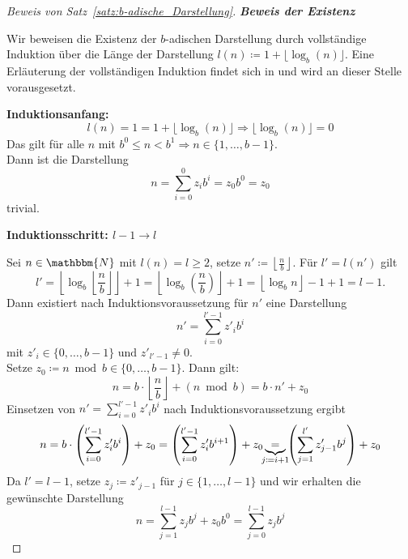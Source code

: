 \documentclass{article}
\newcommand{\N}{\mathbbm{N}} %
\begin{document}
\begin{proof}[Beweis von Satz~\ref{satz:b-adische_Darstellung}]
      \noindent\textbf{\textit{Beweis der Existenz}}

      Wir beweisen die Existenz der $b$-adischen Darstellung durch vollständige Induktion über die Länge der Darstellung $l(n) \coloneq 1+ \lfloor \log_b(n) \rfloor$. 
      Eine Erläuterung der vollständigen Induktion findet sich in \cite[S.~26]{hougardy2018} und wird an dieser Stelle vorausgesetzt.

      \textbf{Induktionsanfang:} 
      \begin{equation*}
        l(n) = 1 = 1+ \lfloor \log_b(n) \rfloor \Rightarrow \lfloor \log_b(n) \rfloor = 0
      \end{equation*}
      Das gilt für alle $n$ mit $b^0 \leq n < b^1 \Rightarrow n \in \{1, \dots, b-1\}$. \\
      Dann ist die Darstellung \[n = \sum_{i=0}^0 z_i b^i = z_0 b^0 = z_0\] trivial.

      \textbf{Induktionsschritt: $l-1 \to l$} 

      Sei $n\in\N$ mit $l(n) = l \geq 2$, setze $n' \coloneq \left\lfloor \displaystyle\frac{n}{b} \right\rfloor$.
      Für $l' = l(n')$ gilt \[l' = \left\lfloor \log_b \left\lfloor \frac{n}{b} \right\rfloor \right\rfloor + 1 = \left\lfloor \log_b (\frac{n}{b}) \right\rfloor + 1 = \left\lfloor \log_b n \right\rfloor - 1 + 1 = l - 1.\]
      Dann existiert nach Induktionsvoraussetzung für $n'$ eine Darstellung 
      \[n' = \sum_{i=0}^{l' -1} z'_i b^i\] 
      mit $z'_i \in \{0,\dots,b-1\} \text{ und } z'_{l'-1} \neq 0$. \\
      Setze $z_0 \coloneq n \bmod b \in \{0, \dots, b-1 \}$. Dann gilt:
      \[n = b \cdot \left\lfloor \frac{n}{b} \right\rfloor + (n \bmod b) = b \cdot n' + z_0\]
      Einsetzen von $n' = \displaystyle\sum_{i=0}^{l'-1}z'_i b^i$ nach Induktionsvoraussetzung ergibt
      \begin{align*}
        n = b\cdot \left(\sum_{i=0}^{l'-1}z'_i b^i\right) + z_0 = \left(\sum_{i=0}^{l'-1}z'_i b^{i+1}\right) + z_0
        \underbrace{=}_{\mathclap{j\coloneq i+1}} \left(\sum_{j=1}^{l'} z'_{j-1}b^j\right) + z_0
      \end{align*}
      Da $l' = l-1$, setze $z_j \coloneq z'_{j-1}$ für $j \in \{1,\dots,l-1\}$ und wir erhalten die gewünschte Darstellung
      \begin{equation*}
        n = \sum_{j=1}^{l-1} z_j b^j + z_0 b^0 = \sum_{j=0}^{l-1} z_jb^j
      \end{equation*}

    \end{proof}
\end{document}
